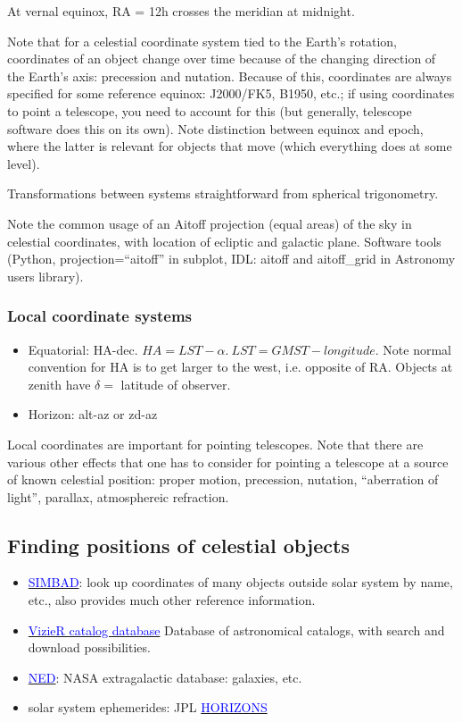 \documentclass{article}
\begin{document}
At vernal equinox, RA = 12h crosses the meridian at midnight.

Note that for a celestial coordinate system tied to the
Earth's rotation,
coordinates of an object change over time because of the changing direction
of the Earth's axis: precession and nutation. Because of this, coordinates are
always specified for some reference equinox: J2000/FK5, B1950, etc.; if using
coordinates to point a telescope, you need to account for this (but generally,
telescope software does this on its own). Note distinction between equinox and
epoch, where the latter is relevant for objects that move (which everything does
at some level).

Transformations between systems straightforward from spherical
trigonometry.

Note the common usage of an Aitoff projection (equal areas)
of the sky in celestial
coordinates, with location of ecliptic and galactic plane.
Software tools (Python, projection=``aitoff'' in subplot,
IDL: aitoff and aitoff\_grid in Astronomy users library).

\subsubsection*{Local coordinate systems}
\begin{itemize}
    \item Equatorial: HA-dec. $HA=LST - \alpha.\ LST=GMST - longitude$.
        Note normal convention for HA is to get larger to the west, i.e.
        opposite of RA. Objects at zenith have $\delta=$ latitude of observer.
    \item Horizon: alt-az or zd-az
\end{itemize}
Local coordinates are important for pointing telescopes. Note that there are
various other effects that one has to consider for pointing a telescope at a
source of known celestial position: proper motion, precession, nutation,
``aberration of light'', parallax, atmosphereic refraction.

\subsection*{Finding positions of celestial objects}
\begin{itemize}
    \item \href{http://simbad.u-strasbg.fr/simbad/}
        {\textcolor{blue}{SIMBAD}}:
        look up coordinates of many objects outside solar system
        by name, etc., also provides much other reference information.
    \item \href{http://vizier.u-strasbg.fr/viz-bin/VizieR}
        {\textcolor{blue}{VizieR catalog database}}
        Database of astronomical catalogs, with search and download
        possibilities.
    \item \href{http://ned.ipac.caltech.edu}
        {\textcolor{blue}{NED}}:
        NASA extragalactic database: galaxies, etc.
    \item solar system ephemerides: JPL
        \href{http://ssd.jpl.nasa.gov/horizons.cgi}
        {\textcolor{blue}{HORIZONS}}
\end{itemize}
\end{document}
